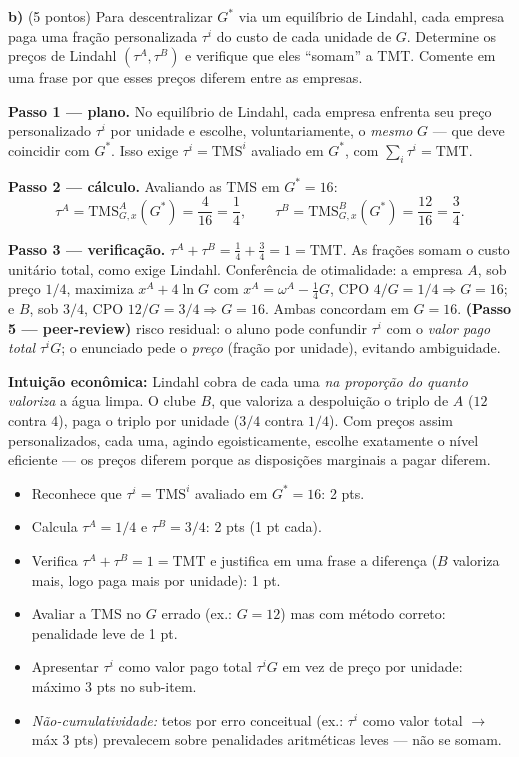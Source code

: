 \textbf{b)} (5 pontos) Para descentralizar $G^{*}$ via um equil\'ibrio de Lindahl, cada empresa paga uma fra\c{c}\~ao personalizada $\tau^i$ do custo de cada unidade de $G$. Determine os pre\c{c}os de Lindahl $(\tau^A,\tau^B)$ e verifique que eles ``somam'' a TMT. Comente em uma frase por que esses pre\c{c}os diferem entre as empresas.
\resolucaobox{7.2cm}
\begin{solucao}
\textbf{Passo 1 --- plano.} No equil\'ibrio de Lindahl, cada empresa enfrenta seu pre\c{c}o personalizado $\tau^i$ por unidade e escolhe, voluntariamente, o \emph{mesmo} $G$ --- que deve coincidir com $G^{*}$. Isso exige $\tau^i=\text{TMS}^i$ avaliado em $G^{*}$, com $\sum_i\tau^i=\text{TMT}$.

\textbf{Passo 2 --- c\'alculo.} Avaliando as TMS em $G^{*}=16$:
\[
\tau^A=\text{TMS}^A_{G,x}(G^{*})=\frac{4}{16}=\frac{1}{4},\qquad \tau^B=\text{TMS}^B_{G,x}(G^{*})=\frac{12}{16}=\frac{3}{4}.
\]

\textbf{Passo 3 --- verifica\c{c}\~ao.} $\tau^A+\tau^B=\tfrac{1}{4}+\tfrac{3}{4}=1=\text{TMT}$. As fra\c{c}\~oes somam o custo unit\'ario total, como exige Lindahl. Confer\^encia de otimalidade: a empresa $A$, sob pre\c{c}o $1/4$, maximiza $x^A+4\ln G$ com $x^A=\omega^A-\tfrac{1}{4}G$, CPO $4/G=1/4\Rightarrow G=16$; e $B$, sob $3/4$, CPO $12/G=3/4\Rightarrow G=16$. Ambas concordam em $G=16$. \textbf{(Passo 5 --- peer-review)} risco residual: o aluno pode confundir $\tau^i$ com o \emph{valor pago total} $\tau^i G$; o enunciado pede o \emph{pre\c{c}o} (fra\c{c}\~ao por unidade), evitando ambiguidade.

\textbf{Intui\c{c}\~ao econ\^omica:} Lindahl cobra de cada uma \emph{na propor\c{c}\~ao do quanto valoriza} a \'agua limpa. O clube $B$, que valoriza a despolui\c{c}\~ao o triplo de $A$ ($12$ contra $4$), paga o triplo por unidade ($3/4$ contra $1/4$). Com pre\c{c}os assim personalizados, cada uma, agindo egoisticamente, escolhe exatamente o n\'ivel eficiente --- os pre\c{c}os diferem porque as disposi\c{c}\~oes marginais a pagar diferem.
\rubricalabel
\begin{itemize}\item Reconhece que $\tau^i=\text{TMS}^i$ avaliado em $G^{*}=16$: 2 pts.\item Calcula $\tau^A=1/4$ e $\tau^B=3/4$: 2 pts (1 pt cada).\item Verifica $\tau^A+\tau^B=1=\text{TMT}$ e justifica em uma frase a diferen\c{c}a ($B$ valoriza mais, logo paga mais por unidade): 1 pt.\item Avaliar a TMS no $G$ errado (ex.: $G=12$) mas com m\'etodo correto: penalidade leve de 1 pt.\item Apresentar $\tau^i$ como valor pago total $\tau^i G$ em vez de pre\c{c}o por unidade: m\'aximo 3 pts no sub-item.\item \emph{N\~ao-cumulatividade:} tetos por erro conceitual (ex.: $\tau^i$ como valor total $\to$ m\'ax 3 pts) prevalecem sobre penalidades aritm\'eticas leves --- n\~ao se somam.\end{itemize}
\end{solucao}

